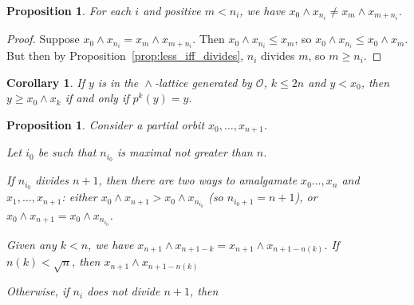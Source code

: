 \documentclass[final,a4paper,12pt,reqno]{amsart}
\newcommand{\meet}{\mathop{\wedge}}
\newtheorem{cor}[thm]{Corollary}
\newtheorem{prop}[thm]{Proposition}
\theoremstyle{remark}
\theoremstyle{definition}
\let \leq \leqslant
\let \geq \geqslant
\begin{document}
	\begin{prop}
		For each $i$ and positive $m<n_i$, we have $x_0\meet x_{n_i}\neq x_m\meet x_{m+n_i}$.
	\end{prop}
	\begin{proof}
		Suppose $x_0\meet x_{n_i}=x_m\meet x_{m+n_i}$. Then $x_0\meet x_{n_i}\leq x_m$, so $x_0\meet x_{n_i}\leq x_0\meet x_m$. But then by Proposition~\ref{prop:less_iff_divides}, $n_i$ divides $m$, so $m\geq n_i$.
	\end{proof}
	
	\begin{cor}
		If $y$ is in the $\meet$-lattice generated by $\mathcal O$, $k\leq 2n$ and $y<x_0$, then $y\geq x_0\meet x_k$ if and only if $p^k(y)=y$.
	\end{cor}
	
	\begin{prop}
		Consider a partial orbit $x_0,\ldots ,x_{n+1}$.
		
		Let $i_0$ be such that $n_{i_0}$ is maximal not greater than $n$.
		
		If $n_{i_0}$ divides $n+1$, then there are two ways to amalgamate $x_0\ldots, x_n$ and $x_1,\ldots, x_{n+1}$: either $x_0\meet x_{n+1}>x_{0}\meet x_{n_{i_0}}$ (so $n_{{i_0}+1}=n+1$), or $x_0\meet x_{n+1}=x_0\meet x_{n_{i_0}}$.
		
		Given any $k<n$, we have $x_{n+1}\meet x_{n+1-k}=x_{n+1}\meet x_{n+1-n(k)}$. If $n(k)<\sqrt n$, then $x_{n+1}\meet x_{n+1-n(k)}$	
		
		Otherwise, if $n_i$ does not divide $n+1$, then 
	\end{prop}
\end{document}
